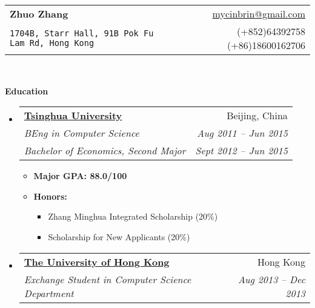 \documentclass[letterpaper,11pt]{article}
\makeatletter
\newcommand{\resitem}[1]{\item #1 \vspace{-2pt}}
\newcommand{\resheading}[1]{{\large \colorbox{mygrey}{\begin{minipage}{\textwidth}{\textbf{#1 \vphantom{p\^{E}}}}\end{minipage}}}}
\newcommand{\ressubheading}[4]{
\begin{tabular*}{6.5in}{l@{\extracolsep{\fill}}r}
        \textbf{#1} & #2 \\
        \textit{#3} & \textit{#4} \\
\end{tabular*}\vspace{-6pt}}
\newcommand{\ressubheadingg}[6]{
\begin{tabular*}{6.5in}{l@{\extracolsep{\fill}}r}
        \textbf{#1} & #2 \\
        \textit{#3} & \textit{#4} \\
        \textit{#5} & \textit{#6} \\
\end{tabular*}\vspace{-6pt}}
\makeatother
\begin{document}
\newcommand{\mywebheader}{
\begin{tabular*}{7in}{l@{\extracolsep{\fill}}r}
    \textbf{{\LARGE Zhuo Zhang}} & \href{mailto:mycinbrin@gmail.com}{mycinbrin@gmail.com}\\
    {\footnotesize \texttt{1704B, Starr Hall, 91B Pok Fu Lam Rd, Hong Kong}} & {(+852)64392758 (+86)18600162706}
    \end{tabular*}
\\
\vspace{0.1in}}

\mywebheader

\resheading{Education}
    \begin{itemize}
            \item
                \ressubheadingg{\href{http://www.tsinghua.edu.cn}{Tsinghua University}}{Beijing, China}{{BEng in Computer Science}}{Aug 2011 -- Jun 2015}{Bachelor of Economics, Second Major}{Sept 2012 -- Jun 2015}
                { \footnotesize
                \begin{itemize}
                        \resitem{\textbf{Major GPA: 88.0/100}}
                        \resitem{\textbf{Honors:}} 
                        \begin{itemize}
                                \resitem{Zhang Minghua Integrated Scholarship (20\%) }
                                \resitem{Scholarship for New Applicants (20\%) }
                        \end{itemize}
                \end{itemize}
                }
            \item
                \ressubheading{\href{http://www.hku.hku}{The University of Hong Kong}}{Hong Kong}{Exchange Student in Computer Science Department}{Aug 2013 -- Dec 2013}{}
    \end{itemize} %
\end{document}
